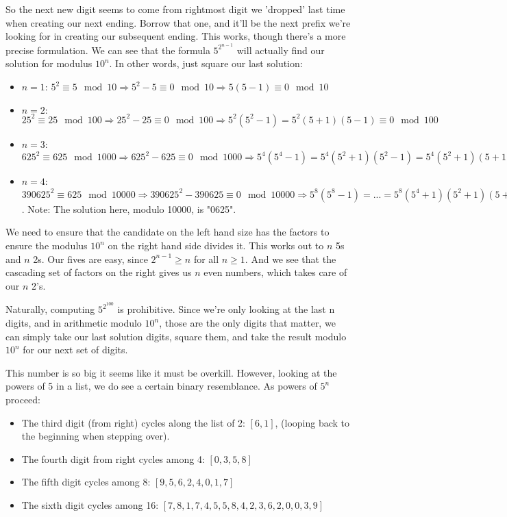 \documentclass[11pt, oneside]{article} 	%
\begin{document}
So the next new digit seems to come from rightmost digit we 'dropped' last time when creating our next ending.  Borrow that one, and it'll be the next prefix we're looking for in creating our subsequent ending.  This works, though there's a more precise formulation.  We can see that the formula $5^{2^{n-1}}$ will actually find our solution for modulus $10^n$.  In other words, just square our last solution: 

\begin{itemize}
\item $n=1$: $5^2 \equiv 5 \mod 10 \Rightarrow 5^2 - 5 \equiv 0 \mod 10 \Rightarrow 5(5-1) \equiv 0 \mod 10$
\item $n=2:$ $25^2 \equiv 25 \mod 100 \Rightarrow 25^2 - 25 \equiv 0 \mod 100 \Rightarrow 5^2(5^2-1) = 5^2(5+1)(5-1) \equiv 0 \mod 100$
\item $n=3$: $625^2 \equiv 625 \mod 1000 \Rightarrow 625^2 - 625 \equiv 0 \mod 1000 \Rightarrow 5^4(5^4-1) = 5^4(5^2+1)(5^2-1) = 5^4(5^2+1)(5+1)(5-1) \equiv 0 \mod 1000$
\item $n=4$:   $390625^2 \equiv 625 \mod 10000 \Rightarrow 390625^2 - 390625 \equiv 0 \mod 10000 \Rightarrow 5^8(5^8-1) = ... =5^8(5^4+1)(5^2+1)(5+1)(5-1) \equiv 0 \mod 10000$.  Note: The solution here, modulo 10000, is "0625".
\end{itemize}

We need to ensure that the candidate on the left hand size has the factors to ensure the modulus $10^n$ on the right hand side divides it.  This works out to $n$ 5s and $n$ 2s.  Our fives are easy, since $2^{n-1} \geq n$ for all $n \geq 1$.  And we see that the cascading set of factors on the right gives us $n$ even numbers, which takes care of our $n$ 2's.

Naturally, computing $5^{2^{100}}$ is prohibitive.  Since we're only looking at the last n digits, and in arithmetic modulo $10^n$, those are the only digits that matter, we can simply take our last solution digits, square them, and take the result modulo $10^n$ for our next set of digits.

This number is so big it seems like it must be overkill.  However, looking at the powers of 5 in a list, we do see a certain binary resemblance.  As powers of $5^n$ proceed:
\begin{itemize}
\item The third digit (from right) cycles along the list of 2: $[6, 1]$, (looping back to the beginning when stepping over).
\item The fourth digit from right cycles among 4: $[0, 3, 5, 8]$
\item The fifth digit cycles among 8: $[9,5,6,2,4,0,1,7]$
\item The sixth digit cycles among 16: $[7,8,1,7,4,5,5,8,4,2,3,6,2,0,0,3,9]$
\end{itemize}
\end{document}
